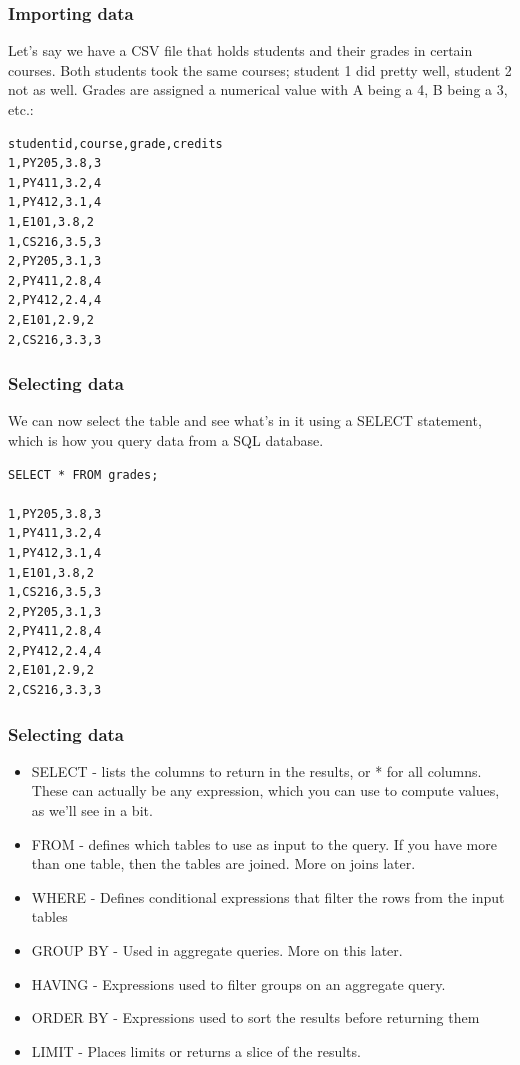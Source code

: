 \begin{frame}[fragile] \frametitle{Importing data}
Let's say we have a CSV file that holds students and their grades in certain courses. Both
students took the same courses; student 1 did pretty well, student 2 not as well. Grades are
assigned a numerical value with A being a 4, B being a 3, etc.:
\begin{lstlisting}
studentid,course,grade,credits
1,PY205,3.8,3
1,PY411,3.2,4
1,PY412,3.1,4
1,E101,3.8,2
1,CS216,3.5,3
2,PY205,3.1,3
2,PY411,2.8,4
2,PY412,2.4,4
2,E101,2.9,2
2,CS216,3.3,3
\end{lstlisting}
\end{frame}

\begin{frame}[fragile] \frametitle{Selecting data}
We can now select the table and see what's in it using a SELECT statement, which is how you query data from a SQL database. 
\begin{lstlisting}
SELECT * FROM grades;

1,PY205,3.8,3
1,PY411,3.2,4
1,PY412,3.1,4
1,E101,3.8,2
1,CS216,3.5,3
2,PY205,3.1,3
2,PY411,2.8,4
2,PY412,2.4,4
2,E101,2.9,2
2,CS216,3.3,3
\end{lstlisting}
\end{frame}

\begin{frame}[fragile] \frametitle{Selecting data}
\begin{itemize}
\item SELECT - lists the columns to return in the results, or * for all columns. These can actually be any expression, which you can use to compute values, as we'll see in a bit.
\item FROM - defines which tables to use as input to the query. If you have more than one table, then the tables are joined. More on joins later.
\item WHERE - Defines conditional expressions that filter the rows from the input tables
\item GROUP BY - Used in aggregate queries. More on this later.
\item HAVING - Expressions used to filter groups on an aggregate query.
\item ORDER BY - Expressions used to sort the results before returning them
\item LIMIT - Places limits or returns a slice of the results.
\end{itemize}
\end{frame}

